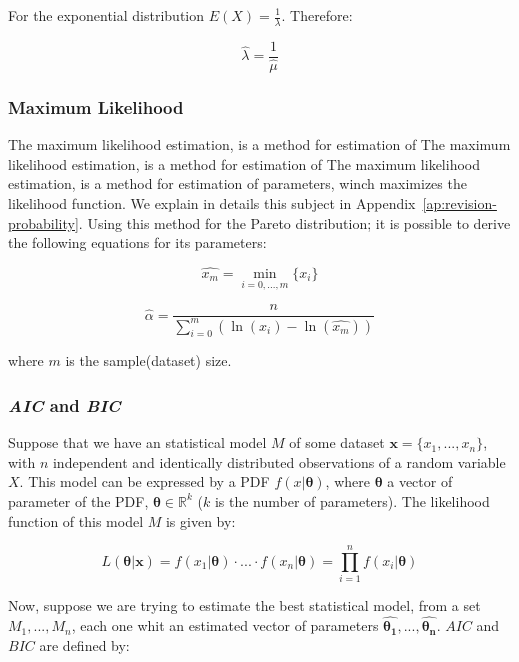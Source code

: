 For the exponential distribution $E(X) = \frac{1}{\lambda}$. Therefore:

\begin{equation}
\hat{\lambda} = \frac{1}{\hat{\mu}}
\end{equation} 

\subsubsection{Maximum Likelihood}

The maximum likelihood estimation, is a method for estimation of The maximum likelihood estimation, is a method for estimation of The maximum likelihood estimation, is a method for estimation of parameters, winch maximizes the likelihood function. We explain in details this subject in Appendix~\ref{ap:revision-probability}. Using this method for the Pareto distribution;  it is possible to derive the following equations for its parameters: 


\begin{equation}
\hat{x_{m}} = \min_{i = 0, ..., m}\{x_{i}\}
\end{equation} 

\begin{equation}
\hat{\alpha} = \frac{n}{ \sum_{i = 0}^{m}(\ln{(x_{i}) - \ln(\hat{x_{m}})})  }
\end{equation} 

where $m$ is the sample(dataset) size.

\subsubsection{\textit{AIC} and \textit{BIC}}


Suppose that we have an statistical model $M$ of some dataset ${\boldsymbol{x} = \{x_1, ..., x_n}\}$, with $n$ independent and identically distributed observations of a random variable $X$. This model can be expressed by a PDF $f(x| \boldsymbol{\theta})$, where $\boldsymbol{\theta}$ a vector of parameter of the PDF, $\boldsymbol{\theta} \in \mathbb{R}^{k}$ ($k$ is the number of parameters). The  likelihood function  of this model $M$ is given by:

\begin{equation}
L(\boldsymbol{\theta}|\boldsymbol{x} ) =  f(x_1|\boldsymbol{\theta})\cdot...\cdot f(x_n|\boldsymbol{\theta}) = \prod_{i = 1}^{n}f(x_i|\boldsymbol{\theta})
\end{equation}

Now, suppose we are trying to estimate the best statistical model, from a set ${M_1, ..., M_n}$, each one whit an estimated vector of parameters  ${\boldsymbol{\hat{\theta_1}}}, ..., {\boldsymbol{\hat{\theta_n}}}$. $AIC$ and $BIC$ are defined by:

